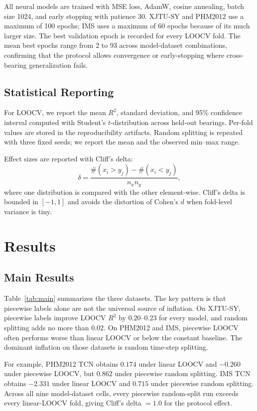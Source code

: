 \documentclass[5p,twocolumn]{elsarticle}
\begin{document}
All neural models are trained with MSE loss, AdamW, cosine annealing, batch size 1024, and early stopping with patience 30. XJTU-SY and PHM2012 use a maximum of 100 epochs; IMS uses a maximum of 60 epochs because of its much larger size. The best validation epoch is recorded for every LOOCV fold. The mean best epochs range from 2 to 93 across model-dataset combinations, confirming that the protocol allows convergence or early-stopping where cross-bearing generalization fails.

\subsection{Statistical Reporting}
For LOOCV, we report the mean $R^2$, standard deviation, and 95\% confidence interval computed with Student's $t$-distribution across held-out bearings. Per-fold values are stored in the reproducibility artifacts. Random splitting is repeated with three fixed seeds; we report the mean and the observed min--max range.

Effect sizes are reported with Cliff's delta:
\begin{equation}
\delta = \frac{\#(x_i > y_j) - \#(x_i < y_j)}{n_x n_y},
\label{eq:cliff}
\end{equation}
where one distribution is compared with the other element-wise. Cliff's delta is bounded in $[-1, 1]$ and avoids the distortion of Cohen's $d$ when fold-level variance is tiny.

\section{Results}
\subsection{Main Results}
Table~\ref{tab:main} summarizes the three datasets. The key pattern is that piecewise labels alone are not the universal source of inflation. On XJTU-SY, piecewise labels improve LOOCV $R^2$ by $0.20$--$0.23$ for every model, and random splitting adds no more than $0.02$. On PHM2012 and IMS, piecewise LOOCV often performs worse than linear LOOCV or below the constant baseline. The dominant inflation on those datasets is random time-step splitting.

For example, PHM2012 TCN obtains $0.174$ under linear LOOCV and $-0.260$ under piecewise LOOCV, but $0.862$ under piecewise random splitting. IMS TCN obtains $-2.331$ under linear LOOCV and $0.715$ under piecewise random splitting. Across all nine model-dataset cells, every piecewise random-split run exceeds every linear-LOOCV fold, giving Cliff's delta $=1.0$ for the protocol effect.
\end{document}
